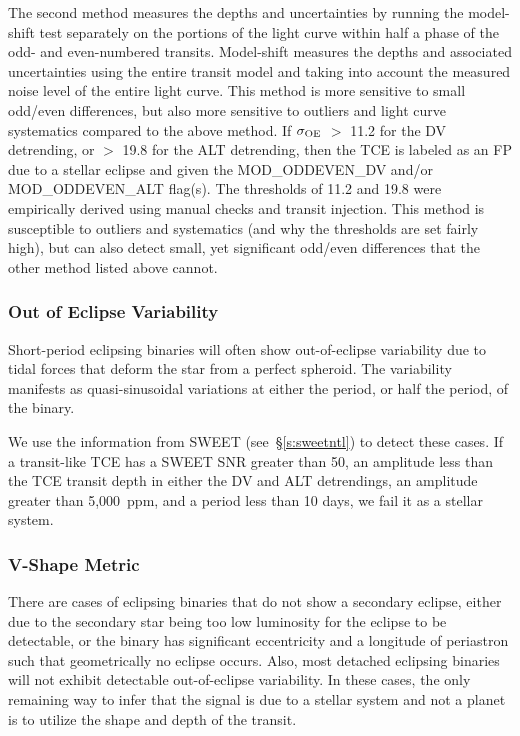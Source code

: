 The second method measures the depths and uncertainties by running the model-shift test separately on the portions of the light curve within half a phase of the odd- and even-numbered transits. Model-shift measures the depths and associated uncertainties using the entire transit model and taking into account the measured noise level of the entire light curve. This method is more sensitive to small odd/even differences, but also more sensitive to outliers and light curve systematics compared to the above method. If $\sigma_{\rm OE}$ $>$ 11.2 for the DV detrending, or $>$ 19.8 for the ALT detrending, then the TCE is labeled as an FP due to a stellar eclipse and given the MOD\_ODDEVEN\_DV and/or MOD\_ODDEVEN\_ALT flag(s). The thresholds of 11.2 and 19.8 were empirically derived using manual checks and transit injection. This method is susceptible to outliers and systematics (and why the thresholds are set fairly high), but can also detect small, yet significant odd/even differences that the other method listed above cannot.


\subsubsection{Out of Eclipse Variability}
\label{s:sweeteb}
Short-period eclipsing binaries will often show out-of-eclipse variability due to tidal forces that deform the star from a perfect spheroid. The variability manifests as quasi-sinusoidal variations at either the period, or half the period, of the binary.

We use the information from SWEET (see~\S\ref{s:sweetntl}) to detect these cases. If a transit-like TCE has a SWEET SNR greater than 50, an amplitude less than the TCE transit depth in either the DV and ALT detrendings, an amplitude greater than 5,000~ppm, and a period less than 10 days, we fail it as a stellar system.



\subsubsection{V-Shape Metric}
\label{s:shapemetric}
There are cases of eclipsing binaries that do not show a secondary eclipse, either due to the secondary star being too low luminosity for the eclipse to be detectable, or the binary has significant eccentricity and a longitude of periastron such that geometrically no eclipse occurs. Also, most detached eclipsing binaries will not exhibit detectable out-of-eclipse variability. In these cases, the only remaining way to infer that the signal is due to a stellar system and not a planet is to utilize the shape and depth of the transit.


